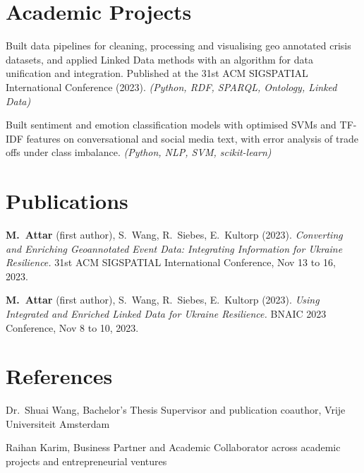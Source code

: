 \documentclass[10pt]{article}
\newcommand{\product}[2]{\Needspace{4\baselineskip}\vspace{2pt}{\bfseries #1}\hfill{\footnotesize #2}\par\vspace{-1pt}}
\begin{document}
\section*{Academic Projects}
\product{LINKED4RESILIENCE: Geo Data Integration for Crisis Response}{}
\begin{tights}
  \item Built data pipelines for cleaning, processing and visualising geo annotated crisis datasets, and applied Linked Data methods with an algorithm for data unification and integration. Published at the 31st ACM SIGSPATIAL International Conference (2023). {\footnotesize\color{gray}\textit{(Python, RDF, SPARQL, Ontology, Linked Data)}}
\end{tights}

\product{Emotion and Sentiment Analysis (Human Language Technology)}{}
\begin{tights}
  \item Built sentiment and emotion classification models with optimised SVMs and TF-IDF features on conversational and social media text, with error analysis of trade offs under class imbalance. {\footnotesize\color{gray}\textit{(Python, NLP, SVM, scikit-learn)}}
\end{tights}

\section*{Publications}
{\small
\textbullet\; \textbf{M.\ Attar} (first author), S.\ Wang, R.\ Siebes, E.\ Kultorp (2023). \textit{Converting and Enriching Geoannotated Event Data: Integrating Information for Ukraine Resilience.} 31st ACM SIGSPATIAL International Conference, Nov 13 to 16, 2023.\par\vspace{2pt}
\textbullet\; \textbf{M.\ Attar} (first author), S.\ Wang, R.\ Siebes, E.\ Kultorp (2023). \textit{Using Integrated and Enriched Linked Data for Ukraine Resilience.} BNAIC 2023 Conference, Nov 8 to 10, 2023.
}

\section*{References}
\vspace{1pt}
{\small
Dr.\ Shuai Wang, Bachelor's Thesis Supervisor and publication coauthor, Vrije Universiteit Amsterdam\par\vspace{2pt}
Raihan Karim, Business Partner and Academic Collaborator across academic projects and entrepreneurial ventures
}
\end{document}
